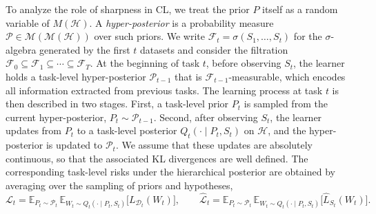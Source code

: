 \documentclass[10pt]{article} %
\begin{document}
To analyze the role of sharpness in CL, we treat the prior $P$ itself as a random variable of $M(\mathcal H)$. A \emph{hyper-posterior} is a probability measure $\mathcal P \in \mathcal M(\mathcal M(\mathcal H))$ over such priors. We write $\mathcal F_t = \sigma(S_1,\dots,S_t)$ for the $\sigma$-algebra generated by the first $t$ datasets and consider the filtration $\mathcal F_0 \subseteq \mathcal F_1 \subseteq \cdots \subseteq \mathcal F_T$. At the beginning of task $t$, before observing $S_t$, the learner holds a task-level hyper-posterior $\mathcal P_{t-1}$ that is $\mathcal F_{t-1}$-measurable, which encodes all information extracted from previous tasks. The learning process at task $t$ is then described in two stages. First, a task-level prior $P_t$ is sampled from the current hyper-posterior,
$
P_t \sim \mathcal P_{t-1}.
$
Second, after observing $S_t$, the learner updates from $P_t$ to a task-level posterior $Q_t(\cdot \mid P_t,S_t)$ on $\mathcal H$, and the hyper-posterior is updated to $\mathcal P_t$. We assume that these updates are absolutely continuous, so that the associated KL divergences are well defined.
The corresponding task-level risks under the hierarchical posterior are obtained by averaging over the sampling of priors and hypotheses,
$$
\mathcal L_t
=
\mathbb E_{P_t \sim \mathcal P_t}
\,
\mathbb E_{W_t \sim Q_t(\cdot \mid P_t,S_t)}
\big[
L_{\mathcal D_t}(W_t)
\big],
\qquad
\hat{\mathcal L}_t
=
\mathbb E_{P_t \sim \mathcal P_t}
\,
\mathbb E_{W_t \sim Q_t(\cdot \mid P_t,S_t)}
\big[
\hat L_{S_t}(W_t)
\big].
$$
\end{document}
